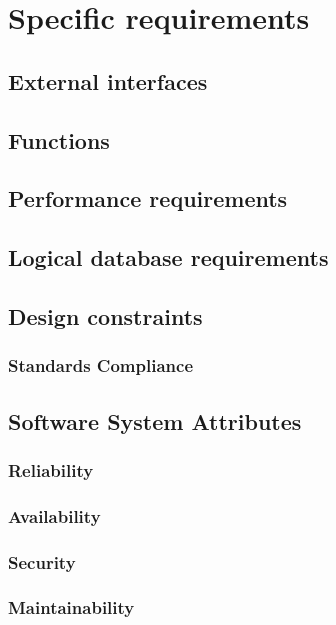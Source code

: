 \section{Specific requirements}

\subsection{External interfaces}

\subsection{Functions}

\subsection{Performance requirements}

\subsection{Logical database requirements}

\subsection{Design constraints}

\subsubsection{Standards Compliance}

\subsection{Software System Attributes}

\subsubsection{Reliability}

\subsubsection{Availability}

\subsubsection{Security}

\subsubsection{Maintainability}

